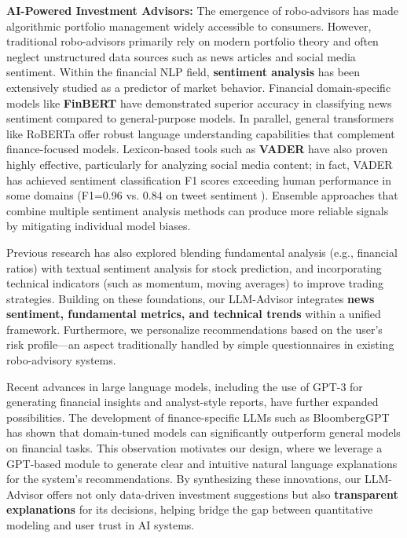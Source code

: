 \documentclass[conference]{IEEEtran}
\begin{document}
\textbf{AI-Powered Investment Advisors:}  
The emergence of robo-advisors has made algorithmic portfolio management widely accessible to consumers. However, traditional robo-advisors primarily rely on modern portfolio theory and often neglect unstructured data sources such as news articles and social media sentiment. Within the financial NLP field, \textbf{sentiment analysis} has been extensively studied as a predictor of market behavior. Financial domain-specific models like \textbf{FinBERT} \cite{b3} have demonstrated superior accuracy in classifying news sentiment compared to general-purpose models. In parallel, general transformers like RoBERTa \cite{b4} offer robust language understanding capabilities that complement finance-focused models. Lexicon-based tools such as \textbf{VADER} have also proven highly effective, particularly for analyzing social media content; in fact, VADER has achieved sentiment classification F1 scores exceeding human performance in some domains (F1=0.96 vs. 0.84 on tweet sentiment \cite{b5}). Ensemble approaches that combine multiple sentiment analysis methods can produce more reliable signals by mitigating individual model biases.

Previous research has also explored blending fundamental analysis (e.g., financial ratios) with textual sentiment analysis for stock prediction, and incorporating technical indicators (such as momentum, moving averages) to improve trading strategies. Building on these foundations, our LLM-Advisor integrates \textbf{news sentiment, fundamental metrics, and technical trends} within a unified framework. Furthermore, we personalize recommendations based on the user’s risk profile—an aspect traditionally handled by simple questionnaires in existing robo-advisory systems.

Recent advances in large language models, including the use of GPT-3 for generating financial insights and analyst-style reports, have further expanded possibilities. The development of finance-specific LLMs such as BloombergGPT \cite{b7} has shown that domain-tuned models can significantly outperform general models on financial tasks. This observation motivates our design, where we leverage a GPT-based module to generate clear and intuitive natural language explanations for the system’s recommendations. By synthesizing these innovations, our LLM-Advisor offers not only data-driven investment suggestions but also \textbf{transparent explanations} for its decisions, helping bridge the gap between quantitative modeling and user trust in AI systems.
\end{document}
